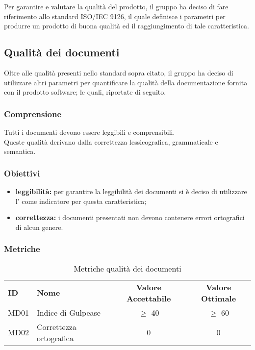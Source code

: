 Per garantire e valutare la qualità del prodotto, il gruppo ha deciso di fare riferimento allo standard ISO/IEC 9126, il quale definisce i parametri per produrre un prodotto di buona qualità ed il raggiungimento di tale caratteristica.

\subsection{Qualità dei documenti}
Oltre alle qualità presenti nello standard sopra citato, il gruppo ha deciso di utilizzare altri parametri per quantificare la qualità della documentazione fornita con il prodotto software; le quali, riportate di seguito.

    \subsubsection{Comprensione}
    Tutti i documenti devono essere leggibili e comprensibili.\\
    Queste qualità derivano dalla correttezza lessicografica, grammaticale e semantica.

    \subsubsection{Obiettivi}
    \begin{itemize}
        \item \textbf{leggibilità:} per garantire la leggibilità dei documenti si è deciso di utilizzare l' come indicatore per questa caratteristica;
        \item \textbf{correttezza:} i documenti presentati non devono contenere errori ortografici di alcun genere.
    \end{itemize}
    \subsubsection{Metriche}
    \begin{table} [h!]
    	\begin{center}
    		\begin{tabular} {m{2 cm} m{7 cm} c c }
    			\rowcolor{lightgray}
    			\textbf{ID} & \textbf{Nome}           & \textbf{Valore Accettabile} & \textbf{Valore Ottimale}\\
    			MD01        & Indice di Gulpease      & $\geq$ 40                   & $\geq$ 60\\
    			MD02        & Correttezza ortografica & 0                           & 0
    		\end{tabular}
    	\caption{Metriche qualità dei documenti}
    	\end{center}
    \end{table}

